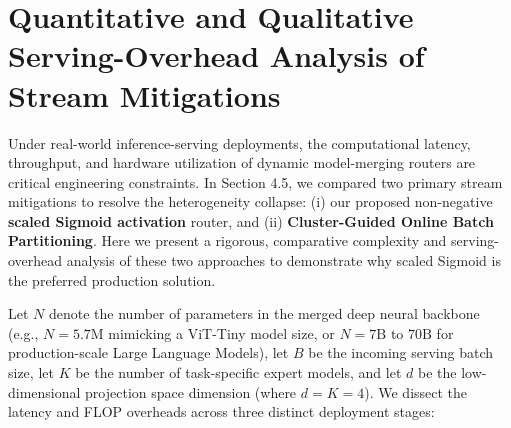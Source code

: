 \section{Quantitative and Qualitative Serving-Overhead Analysis of Stream Mitigations}
\label{sec:serving_overhead}

Under real-world inference-serving deployments, the computational latency, throughput, and hardware
utilization of dynamic model-merging routers are critical engineering constraints. In Section 4.5,
we compared two primary stream mitigations to resolve the heterogeneity collapse: (i) our proposed
non-negative \textbf{scaled Sigmoid activation} router, and (ii) \textbf{Cluster-Guided Online Batch
Partitioning}. Here we present a rigorous, comparative complexity and serving-overhead analysis of
these two approaches to demonstrate why scaled Sigmoid is the preferred production solution.

Let $N$ denote the number of parameters in the merged deep neural backbone (e.g., $N=5.7\text{M}$
mimicking a ViT-Tiny model size, or $N = 7\text{B}$ to $70\text{B}$ for production-scale Large
Language Models), let $B$ be the incoming serving batch size, let $K$ be the number of task-specific
expert models, and let $d$ be the low-dimensional projection space dimension (where $d = K = 4$). We
dissect the latency and FLOP overheads across three distinct deployment stages:


